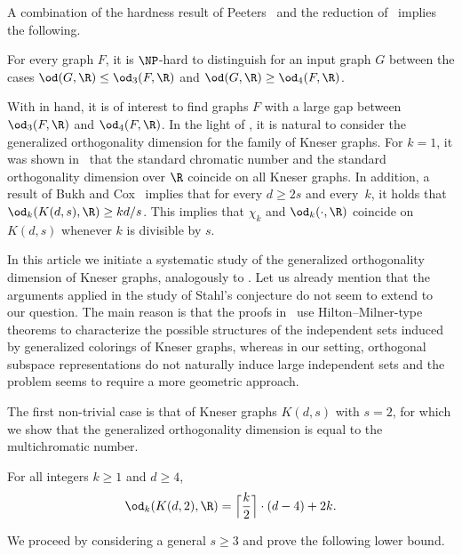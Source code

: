 A combination of the hardness result of Peeters~\cite{Peeters96} and the reduction of~\cite{GareyJ76a} implies the following.

\begin{proposition}\label{prop:xi3vs4}
For every graph $F$, it is $\NP$-hard to 
%
%
distinguish for an input graph $G$ between the cases $\od(G,\R) \leq \od_3(F,\R)$ and $\od(G,\R) \geq \od_4(F,\R)$.
\end{proposition}
\noindent
With  in hand, it is of interest to find graphs $F$ with a large gap between $\od_3(F,\R)$ and $\od_4(F,\R)$.
In
the %
light of , it is natural to consider the generalized orthogonality dimension
%
%
for the family of Kneser graphs.
For $k=1$, it was shown in~\cite{Haviv18topo} that the standard chromatic number and the standard orthogonality dimension over $\R$ coincide on all Kneser graphs. In addition, a result of Bukh and Cox~\cite[Proposition~23]{BukhC18} implies that for every $d \geq 2s$ and every~$k$, it holds that $\od_k(K(d,s),\R) \geq kd/s$. This implies that
%
$\chi_k$ and $\od_k(\cdot,\R)$
%
%
%
%
coincide on $K(d,s)$ whenever $k$ is divisible by $s$.

In this %
article  %
we initiate a systematic study of the generalized orthogonality dimension
%
%
of Kneser graphs, analogously to .
Let us already mention that the arguments applied in the study of Stahl's conjecture do not seem to extend to our question.
The main reason is that the proofs in~\cite{Stahl76,GareyJ76a,CGJ78,Stahl98} use Hilton--Milner-type theorems to characterize the possible structures of the independent sets induced by generalized colorings of Kneser graphs, whereas in our setting, orthogonal subspace representations do not naturally induce large independent sets and the problem seems to require a more geometric approach.

The first non-trivial case is that of Kneser graphs $K(d,s)$ with $s=2$, for which we show that the generalized orthogonality dimension
%
is equal to the multichromatic number.  %

\begin{theorem}\label{thm:Intro_s=2}
For all integers $k \geq 1$ and $d \geq 4$,
\[\od_{k}(K(d,2),\R) = \Big \lceil \frac{k}{2} \Big \rceil \cdot (d-4)+2k.\]
\end{theorem}

We proceed by considering a general $s \geq 3$ and prove the following lower bound.

